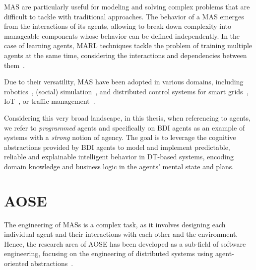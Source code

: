\ac{MAS} are particularly useful for modeling and solving complex problems that are difficult to tackle with traditional approaches.
%
The behavior of a \ac{MAS} emerges from the interactions of its agents, allowing to break down complexity into manageable components whose behavior can be defined independently.
%
In the case of learning agents, \ac{MARL} techniques tackle the problem of training multiple agents at the same time, considering the interactions and dependencies between them~\cite{Albrecht_Christianos_Schäfer_2024}.


Due to their versatility, \ac{MAS} have been adopted in various domains, including robotics~\cite{Vicente-Diaz_2012}, (social) simulation~\cite{Uhrmacher_Weyns_2018,Davidsson_2001}, and distributed control systems for smart grids~\cite{Merabet_Essaaidi_Talei_Abid_Khalil_Madkour_Benhaddou_2014}, \ac{IoT}~\cite{Singh_Chopra_2017}, or traffic management~\cite{Torabi_Wenkstern_Saylor_2020}.

Considering this very broad landscape, in this thesis, when referencing to agents,  we refer to \emph{programmed} agents and specifically on \ac{BDI} agents as an example of systems with a \emph{strong} notion of agency.
%
The goal is to leverage the cognitive abstractions provided by \ac{BDI} agents to model and implement predictable, reliable and explainable intelligent behavior in \ac{DT}-based systems, encoding domain knowledge and business logic in the agents' mental state and plans.

\section{\acl{AOSE}}
\label{sec:back:mas:aose}

The engineering of \acp{MAS} is a complex task, as it involves designing each individual agent and their interactions with each other and the environment.
%
Hence, the research area of \ac{AOSE} has been developed as a sub-field of software engineering, focusing on the engineering of distributed systems using agent-oriented abstractions~\cite{Jennings_1999,Wooldridgey_Ciancarini_2001}.

